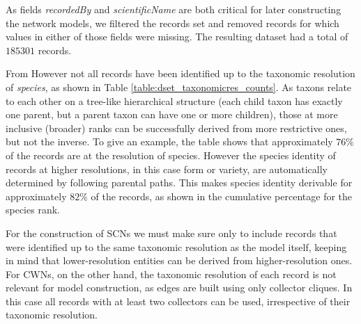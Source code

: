 As fields \textit{recordedBy} and \textit{scientificName} are both critical for later constructing the network models, we filtered the records set and removed records for which values in either of those fields were missing.
The resulting dataset had a total of $185301$ records. 


%
From 
However not all records have been identified up to the taxonomic resolution of \textit{species}, as shown in Table \ref{table:dset_taxonomicres_counts}. 
As taxons relate to each other on a tree-like hierarchical structure (each child taxon has exactly one parent, but a parent taxon can have one or more children), those at more inclusive (broader) ranks can be successfully derived from more restrictive ones, but not the inverse. 
To give an example, the table shows that approximately $76\%$ of the records are at the resolution of species. 
However the species identity of records at higher resolutions, in this case form or variety, are automatically determined by following parental paths. 
This makes species identity derivable for approximately $82\%$ of the records, as shown in the cumulative percentage for the species rank.

For the construction of SCNs we must make sure only to include records that were identified up to the same taxonomic resolution as the model itself, keeping in mind that lower-resolution entities can be derived from higher-resolution ones. 
For CWNs, on the other hand, the taxonomic resolution of each record is not relevant for model construction, as edges are built using only collector cliques. In this case all records with at least two collectors can be used, irrespective of their taxonomic resolution.

